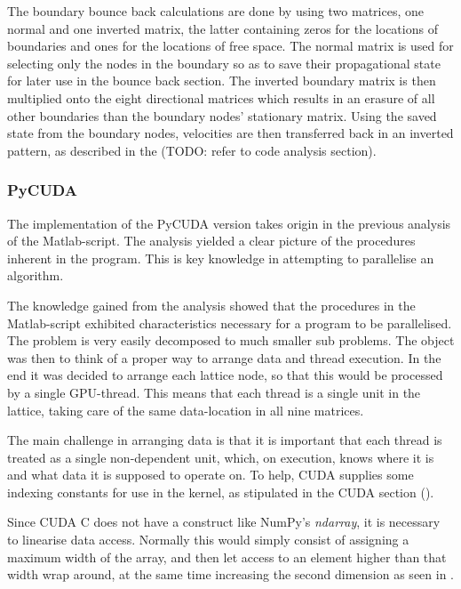 
The boundary bounce back calculations are done by using two matrices, one normal and one inverted matrix, the latter containing zeros for the locations of boundaries and ones for the locations of free space. The normal matrix is used for selecting only the nodes in the boundary so as to save their propagational state for later use in the bounce back section. The inverted boundary matrix is then multiplied onto the eight directional matrices which results in an erasure of all other boundaries than the boundary nodes' stationary matrix. Using the saved state from the boundary nodes, velocities are then transferred back in an inverted pattern, as described in the (TODO: refer to code analysis section).



\subsubsection{PyCUDA}
The implementation of the PyCUDA version takes origin in the previous analysis of the Matlab-script. The analysis yielded a clear picture of the procedures inherent in the program. This is key knowledge in attempting to parallelise an algorithm.

The knowledge gained from the analysis showed that the procedures in the Matlab-script exhibited characteristics necessary for a program to be parallelised. The problem is very easily decomposed to much smaller sub problems. The object was then to think of a proper way to arrange data and thread execution. In the end it was decided to arrange each lattice node, so that this would be processed by a single GPU-thread. This means that each thread is a single unit in the lattice, taking care of the same data-location in all nine matrices.

The main challenge in arranging data is that it is important that each thread is treated as a single non-dependent unit, which, on execution, knows where it is and what data it is supposed to operate on. To help, CUDA supplies some indexing constants for use in the kernel, as stipulated in the CUDA section ().

Since CUDA C does not have a construct like NumPy's \textit{ndarray}, it is necessary to linearise data access. Normally this would simply consist of assigning a maximum width of the array, and then let access to an element higher than that width wrap around, at the same time increasing the second dimension as seen in .

